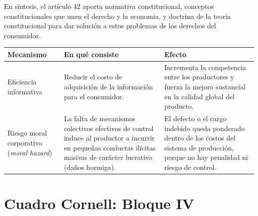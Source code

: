 \documentclass[12pt,oneside]{book}
\begin{document}
En s\'intesis, el art\'iculo 42 aporta normativa constitucional, conceptos constitucionales que unen el derecho y la econom\'ia, y doctrina de la teor\'ia constitucional para dar soluci\'on a estos problemas de los derechos del consumidor.

\begin{center}
{\small\renewcommand{\arraystretch}{1.25}
\begin{tabularx}{\textwidth}{@{}B{0.22\textwidth} Y Y@{}}
\toprule
\textbf{Mecanismo} & \textbf{En qu\'e consiste} & \textbf{Efecto} \\
\midrule
Eficiencia informativa & Reducir el costo de adquisici\'on de la informaci\'on para el consumidor. & Incrementa la competencia entre los productores y fuerza la mejora sustancial en la calidad global del producto. \\
\addlinespace
Riesgo moral corporativo (\emph{moral hazard}) & La falta de mecanismos colectivos efectivos de control induce al productor a incurrir en peque\~nas conductas il\'icitas masivas de car\'acter lucrativo (da\~nos hormiga). & El defecto o el cargo indebido queda ponderado dentro de los costos del sistema de producci\'on, porque no hay penalidad ni riesgo de control. \\
\bottomrule
\end{tabularx}}
\end{center}

\section{Cuadro Cornell: Bloque IV}
\end{document}

